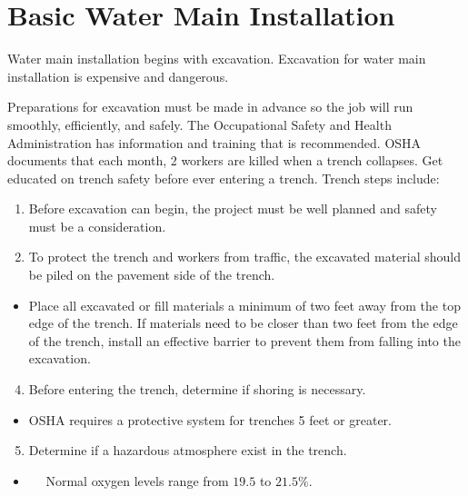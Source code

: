 \documentclass[10pt]{article}
\begin{document}
\section{Basic Water Main Installation}
Water main installation begins with excavation. Excavation for water main installation is expensive and dangerous.

Preparations for excavation must be made in advance so the job will run smoothly, efficiently, and safely. The Occupational Safety and Health Administration has information and training that is recommended. OSHA documents that each month, 2 workers are killed when a trench collapses. Get educated on trench safety before ever entering a trench. Trench steps include:

\begin{enumerate}
  \item Before excavation can begin, the project must be well planned and safety must be a consideration.

  \item To protect the trench and workers from traffic, the excavated material should be piled on the pavement side of the trench.

\end{enumerate}
\begin{itemize}
  \item Place all excavated or fill materials a minimum of two feet away from the top edge of the trench. If materials need to be closer than two feet from the edge of the trench, install an effective barrier to prevent them from falling into the excavation.
\end{itemize}
\begin{enumerate}
  \setcounter{enumi}{3}
  \item Before entering the trench, determine if shoring is necessary.
\end{enumerate}
\begin{itemize}
  \item OSHA requires a protective system for trenches 5 feet or greater.
\end{itemize}
\begin{enumerate}
  \setcounter{enumi}{4}
  \item Determine if a hazardous atmosphere exist in the trench.
\end{enumerate}
\begin{itemize}
  \item $\quad$ Normal oxygen levels range from $19.5$ to $21.5 \%$.
\end{itemize}
\end{document}
